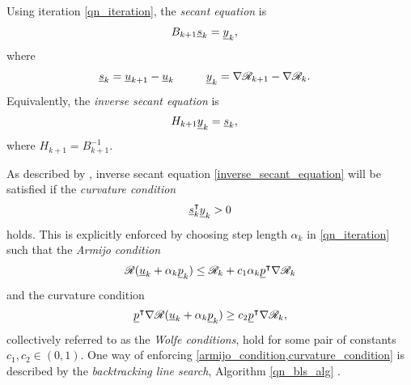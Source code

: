 Using iteration \cref{qn_iteration}, the  \emph{secant equation} is
\begin{align}
  \label{secant_equation}
  B_{k+1} \underline{s}_k &= \underline{y}_k,
\end{align}
where
\begin{align*}
  \rankone{s}_k = \rankone{u}_{k+1} - \rankone{u}_k \hspace{10mm} \rankone{y}_k &= \nabla \mathscr{R}_{k+1} - \nabla \mathscr{R}_k.
\end{align*}
Equivalently, the \emph{inverse secant equation} is
\begin{align}
  \label{inverse_secant_equation}
  H_{k+1} \underline{y}_k &= \underline{s}_k,
\end{align}
where $H_{k+1} = B_{k+1}^{-1}$.

As described by \citet{nocedal_2000}, inverse secant equation \cref{inverse_secant_equation} will be satisfied if the \emph{curvature condition}
\begin{align*}
  \underline{s}_k^\intercal \underline{y}_k > 0
\end{align*} 
holds.  This is explicitly enforced by choosing step length $\alpha_k$ in \cref{qn_iteration} such that the  \emph{Armijo condition}
\begin{align}
  \label{armijo_condition}
  \mathscr{R}(\underline{u}_k + \alpha_k \underline{p}_k ) \leq \mathscr{R}_k + c_1 \alpha_k \underline{p}^\intercal \nabla \mathscr{R}_k
\end{align}
and the curvature condition 
\begin{align}
  \label{curvature_condition}
  \underline{p}^\intercal \nabla \mathscr{R}(\underline{u}_k + \alpha_k \underline{p}_k ) \geq c_2 \underline{p}^\intercal \nabla \mathscr{R}_k,
\end{align}
collectively referred to as the  \emph{Wolfe conditions}, hold for some pair of constants $c_1,c_2 \in (0,1)$.
One way of enforcing \cref{armijo_condition,curvature_condition} is described by the  \emph{backtracking line search}, Algorithm \cref{qn_bls_alg} \citep{nocedal_2000}.

